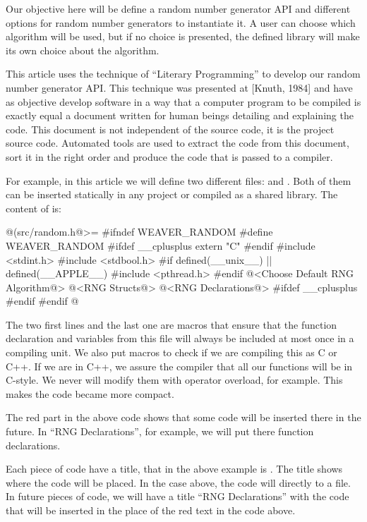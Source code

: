 Our objective here will be define a random number generator API and
different options for random number generators to instantiate it. A
user can choose which algorithm will be used, but if no choice is
presented, the defined library will make its own choice about the
algorithm.


This article uses the technique of ``Literary Programming'' to develop
our random number generator API. This technique was presented at
[Knuth, 1984] and have as objective develop software in a way that a
computer program to be compiled is exactly equal a document written
for human beings detailing and explaining the code. This document is
not independent of the source code, it is the project source
code. Automated tools are used to extract the code from this document,
sort it in the right order and produce the code that is passed to a
compiler.

For example, in this article we will define two different
files:  and . Both of them
can be inserted statically in any project or compiled as a shared
library. The content of  is:

\iniciocodigo
@(src/random.h@>=
#ifndef WEAVER_RANDOM
#define WEAVER_RANDOM
#ifdef __cplusplus
extern "C" {
#endif
#include <stdint.h>
#include <stdbool.h>
#if defined(__unix__) || defined(__APPLE__)
#include <pthread.h>
#endif
@<Choose Default RNG Algorithm@>
@<RNG Structs@>
@<RNG Declarations@>
#ifdef __cplusplus
}
#endif
#endif
@
\fimcodigo

The two first lines and the last one are macros that ensure that the
function declaration and variables from this file will always be
included at most once in a compiling unit. We also put macros to check
if we are compiling this as C or C++. If we are in C++, we assure the
compiler that all our functions will be in C-style. We never will
modify them with operator overload, for example. This makes the code
became more compact.

The red part in the above code shows that some code will be inserted
there in the future. In ``RNG Declarations'', for example, we will put
there function declarations.

Each piece of code have a title, that in the above example is
. The title shows where the code will be placed.
In the case above, the code will directly to a file. In future pieces
of code, we will have a title ``RNG Declarations'' with the code that
will be inserted in the place of the red text in the code above.

